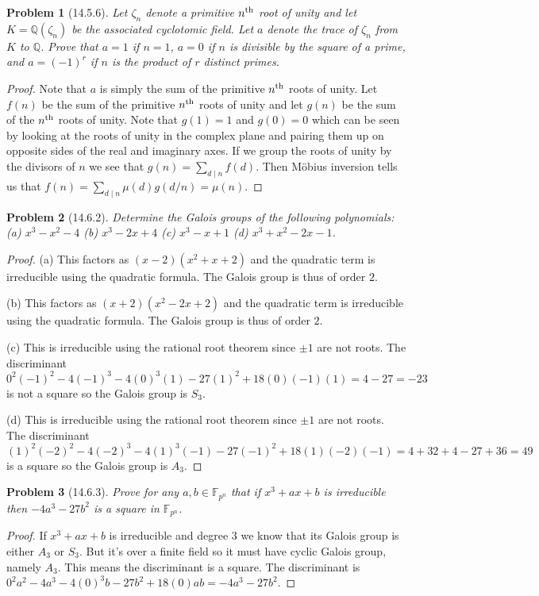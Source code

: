 \documentclass{article}
\newtheorem{problem}{Problem}
\begin{document}
\begin{problem}[14.5.6]
Let $\zeta_n$ denote a primitive $n^{\textup{th}}$ root of unity and let $K = \mathbb{Q}(\zeta_n)$ be the associated cyclotomic field. Let $a$ denote the trace of $\zeta_n$ from $K$ to $\mathbb{Q}$. Prove that $a = 1$ if $n = 1$, $a = 0$ if $n$ is divisible by the square of a prime, and $a = (-1)^r$ if $n$ is the product of $r$ distinct primes.
\end{problem}
\begin{proof}
Note that $a$ is simply the sum of the primitive $n^{\textup{th}}$ roots of unity. Let $f(n)$ be the sum of the primitive $n^{\textup{th}}$ roots of unity and let $g(n)$ be the sum of the $n^{\textup{th}}$ roots of unity. Note that $g(1) = 1$ and $g(0) = 0$ which can be seen by looking at the roots of unity in the complex plane and pairing them up on opposite sides of the real and imaginary axes. If we group the roots of unity by the divisors of $n$ we see that $g(n) = \sum_{d \mid n} f(d)$. Then M\"{o}bius inversion tells us that $f(n) = \sum_{d \mid n} \mu(d) g(d/n) = \mu(n)$.
\end{proof}

\begin{problem}[14.6.2]
Determine the Galois groups of the following polynomials:\\
(a) $x^3-x^2-4$
(b) $x^3-2x+4$
(c) $x^3-x+1$
(d) $x^3+x^2-2x-1$.
\end{problem}
\begin{proof}
(a) This factors as $(x-2)(x^2+x+2)$ and the quadratic term is irreducible using the quadratic formula. The Galois group is thus of order $2$.

(b) This factors as $(x+2)(x^2-2x+2)$ and the quadratic term is irreducible using the quadratic formula. The Galois group is thus of order $2$.

(c) This is irreducible using the rational root theorem since $\pm 1$ are not roots. The discriminant $0^2(-1)^2 - 4(-1)^3 - 4(0)^3(1) - 27(1)^2 + 18(0)(-1)(1) = 4 - 27 = -23$ is not a square so the Galois group is $S_3$.

(d) This is irreducible using the rational root theorem since $\pm 1$ are not roots. The discriminant $(1)^2(-2)^2 - 4(-2)^3 - 4(1)^3(-1) - 27(-1)^2 + 18(1)(-2)(-1) = 4 + 32 + 4 - 27 + 36 = 49$ is a square so the Galois group is $A_3$.
\end{proof}

\begin{problem}[14.6.3]
Prove for any $a,b \in \mathbb{F}_{p^n}$ that if $x^3 + ax + b$ is irreducible then $-4a^3-27b^2$ is a square in $\mathbb{F}_{p^n}$.
\end{problem}
\begin{proof}
If $x^3 + ax + b$ is irreducible and degree $3$ we know that its Galois group is either $A_3$ or $S_3$. But it's over a finite field so it must have cyclic Galois group, namely $A_3$. This means the discriminant is a square. The discriminant is $0^2a^2 - 4a^3 - 4(0)^3b - 27b^2 + 18(0)ab = -4a^3 - 27b^2$.
\end{proof}
\end{document}
